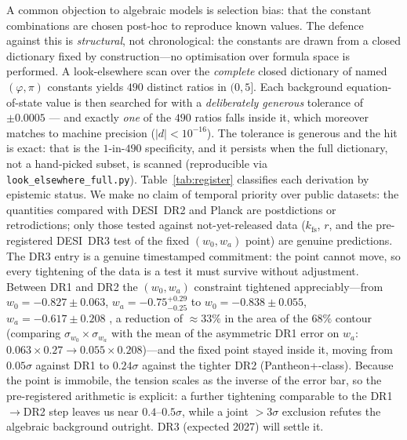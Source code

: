 \documentclass[12pt,a4paper]{article}
\begin{document}
A common objection to algebraic models is selection bias: that the constant
combinations are chosen post-hoc to reproduce known values.
The defence against this is \emph{structural}, not chronological: the constants are
drawn from a closed dictionary fixed by construction---no optimisation over formula
space is performed. A look-elsewhere scan over the \emph{complete} closed dictionary
of named $(\varphi,\pi)$ constants yields $490$ distinct ratios in $(0,5]$. Each
background equation-of-state value is then searched for with a \emph{deliberately
generous} tolerance of $\pm0.0005$ --- and exactly \emph{one} of the $490$ ratios
falls inside it, which moreover matches to machine precision ($|d|<10^{-16}$).
The tolerance is generous and the hit is exact: that is the $1$-in-$490$
specificity, and it persists when the full dictionary,
not a hand-picked subset, is scanned (reproducible via
\texttt{look\_elsewhere\_full.py}). Table~\ref{tab:register}
classifies each derivation by epistemic status. We make no claim of temporal priority
over public datasets: the quantities compared with DESI~DR2 and Planck are
postdictions or retrodictions; only those tested against not-yet-released data
($k_{\mathrm{fs}}$, $r$, and the pre-registered DESI~DR3 test of the fixed
$(w_0,w_a)$ point) are genuine predictions. The DR3 entry is a genuine
timestamped commitment: the point cannot move, so every tightening of the data
is a test it must survive without adjustment. Between DR1 and DR2 the
$(w_0,w_a)$ constraint tightened appreciably---from
$w_0=-0.827\pm0.063$, $w_a=-0.75^{+0.29}_{-0.25}$ \citep{DESI2024VI} to
$w_0=-0.838\pm0.055$, $w_a=-0.617\pm0.208$ \citep{AbdulKarim2025}, a reduction of
$\approx\!33\%$ in the area of the $68\%$ contour (comparing $\sigma_{w_0}\!\times\!\sigma_{w_a}$
with the mean of the asymmetric DR1 error on $w_a$: $0.063\times0.27\to0.055\times0.208$)---and the fixed point stayed
inside it, moving from $0.05\sigma$ against DR1 to $0.24\sigma$ against the
tighter DR2 (Pantheon+-class). Because the point is immobile, the tension scales
as the inverse of the error bar, so the pre-registered arithmetic is explicit:
a further tightening comparable to the DR1$\to$DR2 step leaves us near
$0.4$--$0.5\sigma$, while a joint ${>}3\sigma$ exclusion refutes the algebraic
background outright. DR3 (expected 2027) will settle it.
\end{document}
